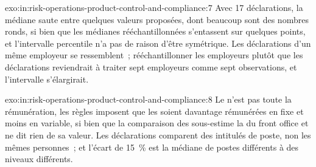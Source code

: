 \begin{solution}{exo:in:risk-operations-product-control-and-compliance:7}
Avec 17 déclarations, la médiane saute entre quelques valeurs proposées, dont beaucoup sont des nombres ronds, si bien que les médianes rééchantillonnées s'entassent
sur quelques points, et l'intervalle percentile n'a pas de raison d'être symétrique. Les déclarations d'un même employeur se ressemblent~; rééchantillonner
les employeurs plutôt que les déclarations reviendrait à traiter sept employeurs comme sept observations, et l'intervalle s'élargirait.
\end{solution}

\begin{solution}{exo:in:risk-operations-product-control-and-compliance:8}
Le  n'est pas toute la rémunération, les règles imposent que les  soient davantage rémunérées en fixe et moins en variable, si bien que la
comparaison des  sous-estime la  du front office et ne dit rien de sa valeur. Les déclarations comparent des intitulés de poste,
non les mêmes personnes~; et l'écart de 15~\% est la médiane de postes différents à des niveaux différents.
\end{solution}

